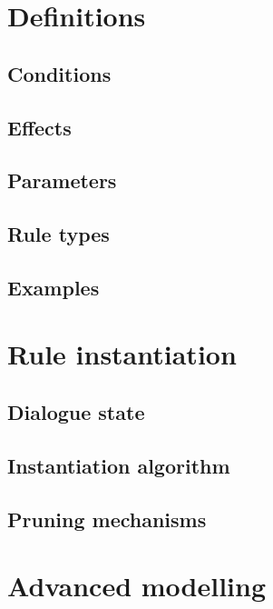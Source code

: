 \section{Definitions}
\label{sec:prules}



\subsection{Conditions}

\subsection{Effects}

\subsection{Parameters}

\subsection{Rule types}

\subsection{Examples}

\section{Rule instantiation}
\label{sec:ruleinstantiation}

\subsection{Dialogue state}


\subsection{Instantiation algorithm}

\subsection{Pruning mechanisms}

\section{Advanced modelling}
\label{sec:amodelling}

